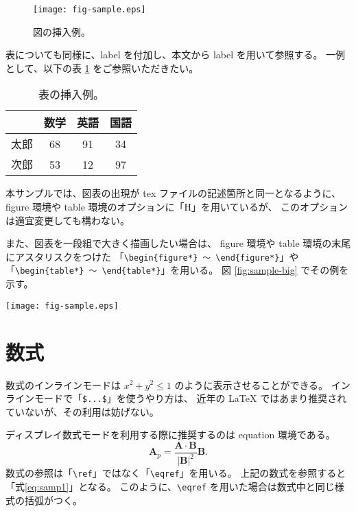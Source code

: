 \documentclass[a4paper,twocolumn]{jsarticle}
\newcommand{\bA}{\mathbf{A}}
\newcommand{\bB}{\mathbf{B}}
\begin{document}
\begin{figure}[H]
 \centering
 \texttt{[image: fig-sample.eps]}
 \caption{\small{図の挿入例。}}
 \label{fig:sample}
\end{figure}

表についても同様に、label を付加し、本文から label を用いて参照する。
一例として、以下の表 \ref{tab:sample} をご参照いただきたい。

\begin{table}[H]
 \caption{\small{表の挿入例。}}
 \centering
 \begin{tabular}{|c|c|c|c|}
	\hline
		& 数学	& 英語	& 国語	\\ \hline
	太郎	& 68	& 91	& 34	\\
	次郎	& 53	& 12	& 97	\\ \hline
 \end{tabular}
 \label{tab:sample}
\end{table}

本サンプルでは、図表の出現が tex ファイルの記述箇所と同一となるように、
figure 環境や table 環境のオプションに「H」を用いているが、
このオプションは適宜変更しても構わない。

また、図表を一段組で大きく描画したい場合は、
figure 環境や table 環境の末尾にアスタリスクをつけた
「\verb+\begin{figure*} 〜 \end{figure*}+」や
「\verb+\begin{table*} 〜 \end{table*}+」を用いる。
図 \ref{fig:sample-big} でその例を示す。

\begin{figure*}[ht]
 \centering
 \texttt{[image: fig-sample.eps]}
 \caption{\small{一段組での図の挿入例。}}
 \label{fig:sample-big}
\end{figure*}

\section{数式}
数式のインラインモードは \(x^2 + y^2 \leq 1\) のように表示させることができる。
インラインモードで「\verb+$...$+」を使うやり方は、
近年の LaTeX ではあまり推奨されていないが、その利用は妨げない。

ディスプレイ数式モードを利用する際に推奨するのは equation 環境である。
\begin{equation}
	\bA_p = \frac{\bA\cdot\bB}{|\bB|^2}\bB .
	\label{eq:samp1}
\end{equation}
数式の参照は「\verb+\ref+」ではなく「\verb+\eqref+」を用いる。
上記の数式を参照すると「式\eqref{eq:samp1}」となる。
このように、\verb+\eqref+ を用いた場合は数式中と同じ様式の括弧がつく。
\end{document}
